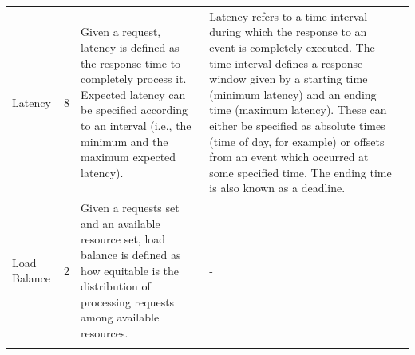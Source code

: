 {\begin{longtable}[c]{|p{0.9in}|c|p{2.3in}|p{2.3in}|c}
	\centering	Latency                        & 8              & Given a request, latency is defined as the response time to completely process it. Expected latency can be specified according to an   interval (i.e., the minimum and the maximum expected latency).                                                                                                                                                                                                                                                                                                                                                                                                                                              & Latency   refers to a time interval during which the response to an event is completely executed. The time interval defines a response window given by a starting   time (minimum latency) and an ending time (maximum latency). These can either   be specified as absolute times (time of day, for example) or offsets from an   event which occurred at some specified time. The ending time is also known as   a deadline.                                 &   \\ \hhline{|-|-|-|-|}
	\centering	Load Balance                   & 2              & Given a requests set and an available resource set, load balance is defined as how equitable is the distribution of processing requests among available resources.                                                                                                                                                                                                                                                                                                                                                                                                                                                                                               & \centering -                                                                                                                                                                                                                                                                                                                                                                                                                                                                                                                                                                                                                                                                                                                                                    &   \\ \hhline{|-|-|-|-|}

\end{longtable}}
